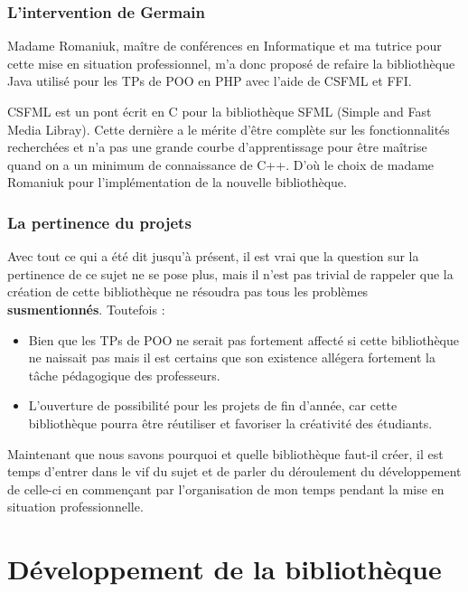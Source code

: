 \documentclass[11pt,a4paper,krantz2,11pt,oneside]{krantz}
\begin{document}
\hypertarget{lintervention-de-germain}{%
\subsection{L'intervention de Germain}\label{lintervention-de-germain}}

Madame Romaniuk, maître de conférences en Informatique et ma tutrice pour cette mise en situation professionnel, m'a donc proposé de refaire la bibliothèque Java utilisé pour les TPs de POO en PHP avec l'aide de CSFML et FFI.

CSFML est un pont écrit en C pour la bibliothèque SFML (Simple and Fast Media Libray). Cette dernière a le mérite d'être complète sur les fonctionnalités recherchées et n'a pas une grande courbe d'apprentissage pour être maîtrise quand on a un minimum de connaissance de C++. D'où le choix de madame Romaniuk pour l'implémentation de la nouvelle bibliothèque.

\hypertarget{la-pertinence-du-projets}{%
\subsection{La pertinence du projets}\label{la-pertinence-du-projets}}

Avec tout ce qui a été dit jusqu'à présent, il est vrai que la question sur la pertinence de ce sujet ne se pose plus, mais il n'est pas trivial de rappeler que la création de cette bibliothèque ne résoudra pas tous les problèmes \textbf{susmentionnés}. Toutefois :

\begin{itemize}
\item
  Bien que les TPs de POO ne serait pas fortement affecté si cette bibliothèque ne naissait pas mais il est certains que son existence allégera fortement la tâche pédagogique des professeurs.
\item
  L'ouverture de possibilité pour les projets de fin d'année, car cette bibliothèque pourra être réutiliser et favoriser la créativité des étudiants.
\end{itemize}

Maintenant que nous savons pourquoi et quelle bibliothèque faut-il créer, il est temps d'entrer dans le vif du sujet et de parler du déroulement du développement de celle-ci en commençant par l'organisation de mon temps pendant la mise en situation professionnelle.

\hypertarget{dev}{%
\chapter{Développement de la bibliothèque}\label{dev}}
\end{document}
